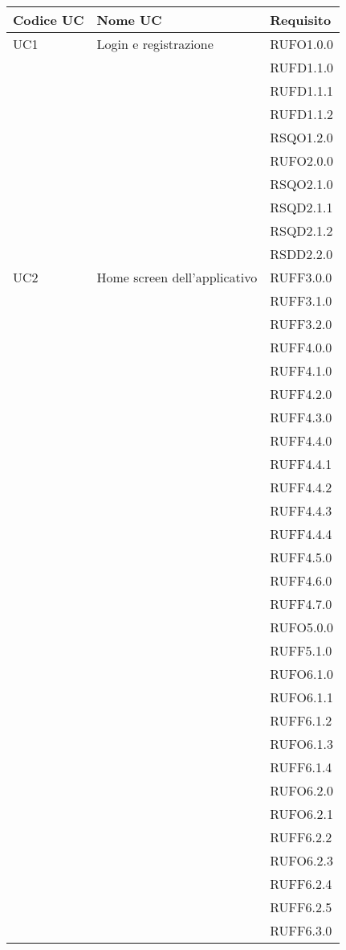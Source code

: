 \begin{center}
\begin{longtable}{lp{}l}
\toprule Codice UC & Nome UC  & Requisito\\
\midrule
UC1 & Login e registrazione & RUFO1.0.0 \\
 &  & RUFD1.1.0 \\
 &  & RUFD1.1.1 \\
 &  & RUFD1.1.2 \\
 &  & RSQO1.2.0 \\
 &  & RUFO2.0.0 \\
 &  & RSQO2.1.0 \\
 &  & RSQD2.1.1 \\
 &  & RSQD2.1.2 \\
 &  & RSDD2.2.0 \\
UC2 & Home screen dell'applicativo & RUFF3.0.0 \\
 &  & RUFF3.1.0 \\
 &  & RUFF3.2.0 \\
 &  & RUFF4.0.0 \\
 &  & RUFF4.1.0 \\
 &  & RUFF4.2.0 \\
 &  & RUFF4.3.0 \\
 &  & RUFF4.4.0 \\
 &  & RUFF4.4.1 \\
 &  & RUFF4.4.2 \\
 &  & RUFF4.4.3 \\
 &  & RUFF4.4.4 \\
 &  & RUFF4.5.0 \\
 &  & RUFF4.6.0 \\
 &  & RUFF4.7.0 \\
 &  & RUFO5.0.0 \\
 &  & RUFF5.1.0 \\
 &  & RUFO6.1.0 \\
 &  & RUFO6.1.1 \\
 &  & RUFF6.1.2 \\
 &  & RUFO6.1.3 \\
 &  & RUFF6.1.4 \\
 &  & RUFO6.2.0 \\
 &  & RUFO6.2.1 \\
 &  & RUFF6.2.2 \\
 &  & RUFO6.2.3 \\
 &  & RUFF6.2.4 \\
 &  & RUFF6.2.5 \\
 &  & RUFF6.3.0 \\

\end{longtable}
\end{center}
